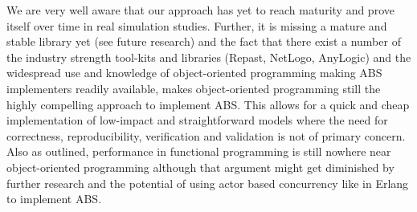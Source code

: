 We are very well aware that our approach has yet to reach maturity and prove itself over time in real simulation studies. Further, it is missing a mature and stable library yet (see future research) and the fact that there exist a number of the industry strength tool-kits and libraries (Repast, NetLogo, AnyLogic) and the widespread use and knowledge of object-oriented programming making ABS implementers readily available, makes object-oriented programming still the highly compelling approach to implement ABS. This allows for a quick and cheap implementation of low-impact and straightforward models where the need for correctness, reproducibility, verification and validation is not of primary concern. Also as outlined, performance in functional programming is still nowhere near object-oriented programming although that argument might get diminished by further research and the potential of using actor based concurrency like in Erlang to implement ABS. %